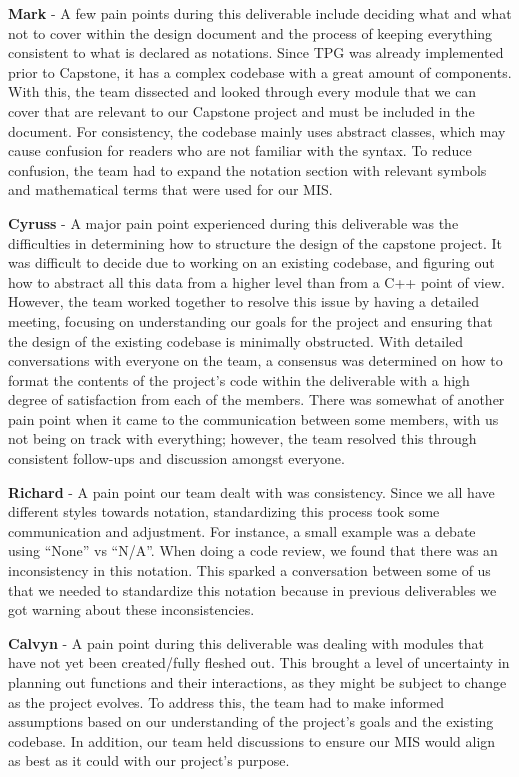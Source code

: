 \documentclass[12pt, titlepage]{article}
\begin{document}
\begin{enumerate}
    \textbf{Mark} - A few pain points during this deliverable include deciding what and what not to cover within the design document and the process of keeping everything consistent to what is declared as notations. Since TPG was already implemented prior to Capstone, it has a complex codebase with a great amount of components. With this, the team dissected and looked through every module that we can cover that are relevant to our Capstone project and must be included in the document. For consistency, the codebase mainly uses abstract classes, which may cause confusion for readers who are not familiar with the syntax. To reduce confusion, the team had to expand the notation section with relevant symbols and mathematical terms that were used for our MIS.

    \textbf{Cyruss} - A major pain point experienced during this deliverable was the difficulties in determining how to structure the design of the capstone project. It was difficult to decide due to working on an existing codebase, and figuring out how to abstract all this data from a higher level than from a C++ point of view. However, the team worked together to resolve this issue by having a detailed meeting, focusing on understanding our goals for the project and ensuring that the design of the existing codebase is minimally obstructed. With detailed conversations with everyone on the team, a consensus was determined on how to format the contents of the project’s code within the deliverable with a high degree of satisfaction from each of the members. There was somewhat of another pain point when it came to the communication between some members, with us not being on track with everything; however, the team resolved this through consistent follow-ups and discussion amongst everyone.
    
    \textbf{Richard} -  A pain point our team dealt with was consistency. Since we all have different styles towards notation, standardizing this process took some communication and adjustment. For instance, a small example was a debate using “None” vs “N/A”. When doing a code review, we found that there was an inconsistency in this notation. This sparked a conversation between some of us that we needed to standardize this notation because in previous deliverables we got warning about these inconsistencies. 
    
    
    \textbf{Calvyn} -  A pain point during this deliverable was dealing with modules that have not yet been created/fully fleshed out. This brought a level of uncertainty in planning out functions and their interactions, as they might be subject to change as the project evolves. To address this, the team had to make informed assumptions based on our understanding of the project's goals and the existing codebase. In addition, our team held discussions to ensure our MIS would align as best as it could with our project’s purpose.
    

\end{enumerate}
\end{document}
